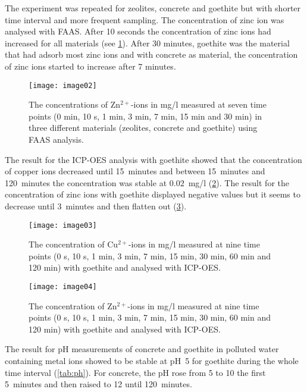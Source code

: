 The experiment was repeated for zeolites, concrete and goethite but with shorter time interval and more frequent sampling. The concentration of zinc ion was analysed with FAAS. After 10 seconds the concentration of zinc ions had increased for all materials (see \cref{fig:image02}). After 30 minutes, goethite was the material that had adsorb most zinc ions and with concrete as material, the concentration of zinc ions started to increase after 7 minutes.

\begin{figure}[H]
    \centering
    \texttt{[image: image02]}
    \caption{The concentrations of Zn$^{2+}$-ions in mg/l measured at seven time
        points (0 min, 10 s, 1 min, 3 min, 7 min, 15 min and 30 min) in three
            different materials (zeolites, concrete and goethite) using FAAS
            analysis.}\label{fig:image02}
\end{figure}

The result for the ICP-OES analysis with goethite showed that the concentration of copper ions decreased until 15~minutes and between 15~minutes and 120~minutes the concentration was stable at $0.02$~mg/l (\cref{fig:image03}). The result for the concentration of zinc ions with goethite displayed negative values but it seems to decrease until 3~minutes and then flatten out (\cref{fig:image04}).

\begin{figure}[H]
    \centering
    \texttt{[image: image03]}
    \caption{The concentration of Cu$^{2+}$-ions in mg/l measured at nine time
        points (0 s, 10 s, 1 min, 3 min, 7 min, 15 min, 30 min, 60 min and 120
                min) with goethite and analysed with ICP-OES.}\label{fig:image03}
\end{figure}


\begin{figure}[H]
    \centering
    \texttt{[image: image04]}
    \caption{The concentration of Zn$^{2+}$-ions in mg/l measured at nine time
        points (0 s, 10 s, 1 min, 3 min, 7 min, 15 min, 30 min, 60 min and 120
                min) with goethite and analysed with ICP-OES.}\label{fig:image04}
\end{figure}

The result for pH measurements of concrete and goethite in polluted water containing metal ions showed to be stable at pH~5 for goethite during the whole time interval (\cref{tab:ph}). For concrete, the pH rose from 5 to 10 the first 5~minutes and then raised to 12 until 120~minutes. 

